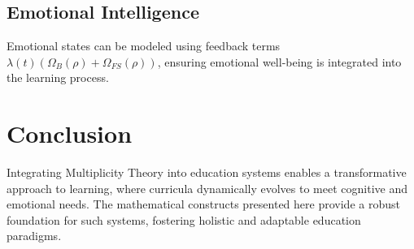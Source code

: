 \documentclass{article}
\theoremstyle{plain}
\begin{document}
\subsection{Emotional Intelligence}
Emotional states can be modeled using feedback terms \( \lambda(t)(\Omega_B(\rho) + \Omega_{FS}(\rho)) \), ensuring emotional well-being is integrated into the learning process.

\section{Conclusion}
Integrating Multiplicity Theory into education systems enables a transformative approach to learning, where curricula dynamically evolves to meet cognitive and emotional needs. The mathematical constructs presented here provide a robust foundation for such systems, fostering holistic and adaptable education paradigms.


\nocite{*}


\end{document}
